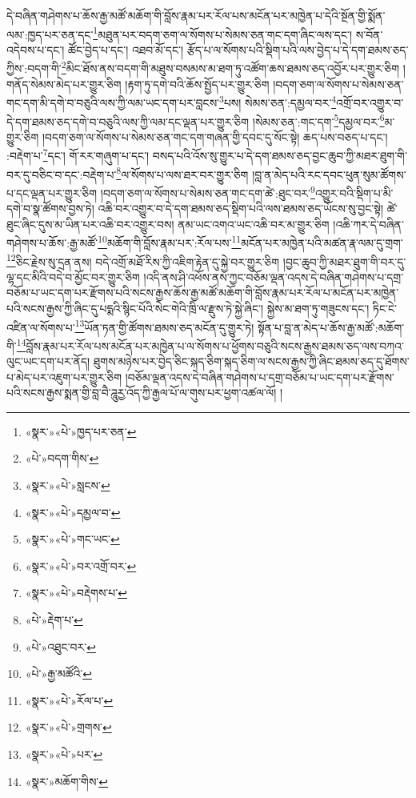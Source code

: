 དེ་བཞིན་གཤེགས་པ་ཆོས་རྒྱ་མཚོ་མཆོག་གི་བློས་རྣམ་པར་རོལ་པས་མངོན་པར་མཁྱེན་པ་དེའི་སྔོན་གྱི་སྨོན་ལམ་:ཁྱད་པར་ཅན་དང་\footnote{«སྣར་»«པེ་»ཁྱད་པར་ཅན་}མཐུན་པར་བདག་ཅག་ལ་སོགས་པ་སེམས་ཅན་གང་དག་ཞིང་ལས་དང་། ས་བོན་འདེབས་པ་དང་། ཚོང་བྱེད་པ་དང་། འཐབ་མོ་དང་། རྩོད་པ་ལ་སོགས་པའི་སྡིག་པའི་ལས་བྱེད་པ་དེ་དག་ཐམས་ཅད་ཀྱིས་:བདག་གི་\footnote{«པེ་»བདག་གིས་}མིང་ཐོས་ནས་བདག་གི་མཐུས་བསམས་མ་ཐག་ཏུ་འཚོག་ཆས་ཐམས་ཅད་འབྱོར་པར་གྱུར་ཅིག །གནོད་སེམས་མེད་པར་གྱུར་ཅིག །རྟག་ཏུ་དགེ་བའི་ཆོས་སྤྱོད་པར་གྱུར་ཅིག །བདག་ཅག་ལ་སོགས་པ་སེམས་ཅན་གང་དག་མི་དགེ་བ་བཅུའི་ལས་ཀྱི་ལམ་ཡང་དག་པར་བླངས་\footnote{«སྣར་»«པེ་»སླངས་}པས། སེམས་ཅན་:དམྱལ་བར་\footnote{«སྣར་»«པེ་»དམྱལ་བ་}འགྲོ་བར་འགྱུར་བ་དེ་དག་ཐམས་ཅད་དགེ་བ་བཅུའི་ལས་ཀྱི་ལམ་དང་ལྡན་པར་གྱུར་ཅིག །སེམས་ཅན་:གང་དག་\footnote{«སྣར་»«པེ་»གང་ཡང་}དམྱལ་བར་\footnote{«སྣར་»«པེ་»བར་འགྲོ་བར་}མ་གྱུར་ཅིག །བདག་ཅག་ལ་སོགས་པ་སེམས་ཅན་གང་དག་གཞན་གྱི་དབང་དུ་སོང་སྟེ། ཆད་པས་བཅད་པ་དང་། :བརྡེག་པ་\footnote{«སྣར་»«པེ་»བརྡེགས་པ་}དང་། གོ་རར་གཞུག་པ་དང་། བསད་པའི་འོས་སུ་གྱུར་པ་དེ་དག་ཐམས་ཅད་བྱང་ཆུབ་ཀྱི་མཐར་ཐུག་གི་བར་དུ་བཅིང་བ་དང་:བརྡེག་པ་\footnote{«པེ་»རྡེག་པ་}ལ་སོགས་པ་ལས་ཐར་བར་གྱུར་ཅིག །བླ་ན་མེད་པའི་རང་དབང་ཕུན་སུམ་ཚོགས་པ་དང་ལྡན་པར་གྱུར་ཅིག །བདག་ཅག་ལ་སོགས་པ་སེམས་ཅན་གང་དག་ཚེ་:ཐུང་བར་\footnote{«པེ་»འཐུང་བར་}འགྱུར་བའི་སྡིག་པ་མི་དགེ་བ་སྣ་ཚོགས་བྱས་ཏེ། འཆི་བར་འགྱུར་བ་དེ་དག་ཐམས་ཅད་སྡིག་པའི་ལས་ཐམས་ཅད་ཡོངས་སུ་བྱང་སྟེ། ཚེ་ཐུང་ཞིང་དུས་མ་ཡིན་པར་འཆི་བར་འགྱུར་བས། ནམ་ཡང་འགའ་ཡང་འཆི་བར་མ་གྱུར་ཅིག །འཆི་ཀར་དེ་བཞིན་གཤེགས་པ་ཆོས་:རྒྱ་མཚོ་\footnote{«པེ་»རྒྱ་མཚོའི་}མཆོག་གི་བློས་རྣམ་པར་:རོལ་པས་\footnote{«སྣར་»«པེ་»རོལ་པ་}མངོན་པར་མཁྱེན་པའི་མཚན་རྣ་ལམ་དུ་གྲག་\footnote{«སྣར་»«པེ་»གྲགས་}ཅིང་རྗེས་སུ་དྲན་ནས། བདེ་འགྲོ་མཐོ་རིས་ཀྱི་འཇིག་རྟེན་དུ་སྐྱེ་བར་གྱུར་ཅིག །བྱང་ཆུབ་ཀྱི་མཐར་ཐུག་གི་བར་དུ་ལྷ་དང་མིའི་བདེ་བ་མྱོང་བར་གྱུར་ཅིག །འདི་ནས་ཤི་འཕོས་ནས་ཀྱང་བཅོམ་ལྡན་འདས་དེ་བཞིན་གཤེགས་པ་དགྲ་བཅོམ་པ་ཡང་དག་པར་རྫོགས་པའི་སངས་རྒྱས་ཆོས་རྒྱ་མཚོ་མཆོག་གི་བློས་རྣམ་པར་རོལ་པ་མངོན་པར་མཁྱེན་པའི་སངས་རྒྱས་ཀྱི་ཞིང་དུ་པདྨའི་སྙིང་པོའི་སེང་གེའི་ཁྲི་ལ་རྫུས་ཏེ་སྐྱེ་ཞིང་། སྐྱེས་མ་ཐག་ཏུ་གཟུངས་དང་། ཏིང་ངེ་འཛིན་ལ་སོགས་པ་\footnote{«སྣར་»«པེ་»པར་}ཡོན་ཏན་གྱི་ཚོགས་ཐམས་ཅད་མངོན་དུ་གྱུར་ཏེ། སྟོན་པ་བླ་ན་མེད་པ་ཆོས་རྒྱ་མཚོ་:མཆོག་གི་\footnote{«སྣར་»མཆོག་གིས་}བློས་རྣམ་པར་རོལ་པས་མངོན་པར་མཁྱེན་པ་ལ་སོགས་པ་ཕྱོགས་བཅུའི་སངས་རྒྱས་ཐམས་ཅད་ལས་བཀའ་ལུང་ཡང་དག་པར་ནོད། ཐུགས་མཉེས་པར་བྱེད་ཅིང་སྐད་ཅིག་སྐད་ཅིག་ལ་སངས་རྒྱས་ཀྱི་ཞིང་ཐམས་ཅད་དུ་ཐོགས་པ་མེད་པར་འཇུག་པར་གྱུར་ཅིག །བཅོམ་ལྡན་འདས་དེ་བཞིན་གཤེགས་པ་དགྲ་བཅོམ་པ་ཡང་དག་པར་རྫོགས་པའི་སངས་རྒྱས་སྨན་གྱི་བླ་བཻ་ཌཱུརྱ་འོད་ཀྱི་རྒྱལ་པོ་ལ་གུས་པར་ཕྱག་འཚལ་ལོ། །
